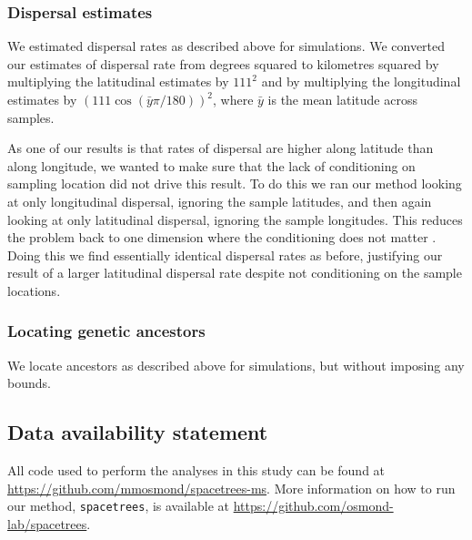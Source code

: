 \documentclass[12pt]{article}
\begin{document}
\subsubsection*{Dispersal estimates}

We estimated dispersal rates as described above for simulations.
We converted our estimates of dispersal rate from degrees squared to kilometres squared by multiplying the latitudinal estimates by $111^2$ and by multiplying the longitudinal estimates by $(111\cos(\bar{y} \pi/180))^2$, where $\bar{y}$ is the mean latitude across samples.

As one of our results is that rates of dispersal are higher along latitude than along longitude, we wanted to make sure that the lack of conditioning on sampling location did not drive this result. 
To do this we ran our method looking at only longitudinal dispersal, ignoring the sample latitudes, and then again looking at only latitudinal dispersal, ignoring the sample longitudes. 
This reduces the problem back to one dimension where the conditioning does not matter \citep[as discussed above and in][]{meligkotsidou2007postprocessing}. 
Doing this we find essentially identical dispersal rates as before, justifying our result of a larger latitudinal dispersal rate despite not conditioning on the sample locations. 

\subsubsection*{Locating genetic ancestors}

We locate ancestors as described above for simulations, but without imposing any bounds.

\subsection*{Data availability statement}

All code used to perform the analyses in this study can be found at \url{https://github.com/mmosmond/spacetrees-ms}.
More information on how to run our method, \texttt{spacetrees}, is available at \url{https://github.com/osmond-lab/spacetrees}.
\end{document}
